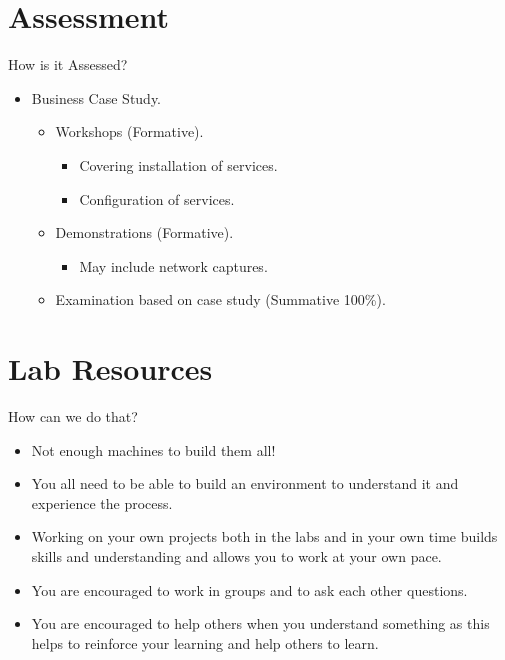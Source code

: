 \documentclass{beamer}
\begin{document}
\section{Assessment}
\begin{frame}{How is it Assessed?}
  \begin{itemize}
    \item Business Case Study.
    \begin{itemize}
      \item Workshops (Formative).
        \begin{itemize}
          \item Covering installation of services.
          \item Configuration of services.
        \end{itemize}
      \item Demonstrations (Formative).
        \begin{itemize}
          \item May include network captures.
        \end{itemize}
    \item Examination based on case study (Summative 100\%).
    \end{itemize}
  \end{itemize}
\end{frame}

\section{Lab Resources}
\begin{frame}{How can we do that?}
  \begin{itemize}
    \item Not enough machines to build them all!
    \item You all need to be able to build an environment to understand it and experience the process.
    \item Working on your own projects both in the labs and in your own time builds skills and understanding and allows you to work at your own pace.
    \item You are encouraged to work in groups and to ask each other questions.
    \item You are encouraged to help others when you understand something as this helps to reinforce your learning and help others to learn. 
  \end{itemize}
\end{frame}
\end{document}
